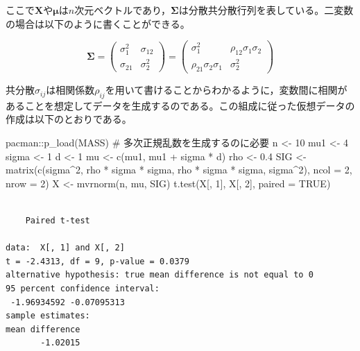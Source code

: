 \documentclass[
  a4paper,
]{ltjsbook}
\newenvironment{Shaded}{\begin{snugshade}}{\end{snugshade}}
\newcommand{\AttributeTok}[1]{\textcolor[rgb]{0.40,0.45,0.13}{#1}}
\newcommand{\CommentTok}[1]{\textcolor[rgb]{0.37,0.37,0.37}{#1}}
\newcommand{\ConstantTok}[1]{\textcolor[rgb]{0.56,0.35,0.01}{#1}}
\newcommand{\DecValTok}[1]{\textcolor[rgb]{0.68,0.00,0.00}{#1}}
\newcommand{\FloatTok}[1]{\textcolor[rgb]{0.68,0.00,0.00}{#1}}
\newcommand{\FunctionTok}[1]{\textcolor[rgb]{0.28,0.35,0.67}{#1}}
\newcommand{\NormalTok}[1]{\textcolor[rgb]{0.00,0.23,0.31}{#1}}
\newcommand{\OtherTok}[1]{\textcolor[rgb]{0.00,0.23,0.31}{#1}}
\newcommand{\SpecialCharTok}[1]{\textcolor[rgb]{0.37,0.37,0.37}{#1}}
\begin{document}
ここで\(\mathbf{X}\)や\(\mathbf{\mu}\)は\(n\)次元ベクトルであり，\(\mathbf{\Sigma}\)は分散共分散行列を表している。二変数の場合は以下のように書くことができる。

\[\mathbf{\Sigma} = \begin{pmatrix} \sigma_1^2 & \sigma_{12}\\ \sigma_{21} & \sigma_2^2 \end{pmatrix} = \begin{pmatrix} \sigma_1^2 & \rho_{12}\sigma_1\sigma_2 \\ \rho_{21}\sigma_2\sigma_1 & \sigma_2^2 \end{pmatrix}\]

共分散\(\sigma_{ij}\)は相関係数\(\rho_{ij}\)を用いて書けることからわかるように，変数間に相関があることを想定してデータを生成するのである。この組成に従った仮想データの作成は以下のとおりである。

\begin{Shaded}
\begin{Highlighting}[]
\NormalTok{pacman}\SpecialCharTok{::}\FunctionTok{p\_load}\NormalTok{(MASS) }\CommentTok{\# 多次正規乱数を生成するのに必要}
\NormalTok{n }\OtherTok{\textless{}{-}} \DecValTok{10}
\NormalTok{mu1 }\OtherTok{\textless{}{-}} \DecValTok{4}
\NormalTok{sigma }\OtherTok{\textless{}{-}} \DecValTok{1}
\NormalTok{d }\OtherTok{\textless{}{-}} \DecValTok{1}
\NormalTok{mu }\OtherTok{\textless{}{-}} \FunctionTok{c}\NormalTok{(mu1, mu1 }\SpecialCharTok{+}\NormalTok{ sigma }\SpecialCharTok{*}\NormalTok{ d)}
\NormalTok{rho }\OtherTok{\textless{}{-}} \FloatTok{0.4}
\NormalTok{SIG }\OtherTok{\textless{}{-}} \FunctionTok{matrix}\NormalTok{(}\FunctionTok{c}\NormalTok{(sigma}\SpecialCharTok{\^{}}\DecValTok{2}\NormalTok{, rho }\SpecialCharTok{*}\NormalTok{ sigma }\SpecialCharTok{*}\NormalTok{ sigma, rho }\SpecialCharTok{*}\NormalTok{ sigma }\SpecialCharTok{*}\NormalTok{ sigma, sigma}\SpecialCharTok{\^{}}\DecValTok{2}\NormalTok{), }\AttributeTok{ncol =} \DecValTok{2}\NormalTok{, }\AttributeTok{nrow =} \DecValTok{2}\NormalTok{)}
\NormalTok{X }\OtherTok{\textless{}{-}} \FunctionTok{mvrnorm}\NormalTok{(n, mu, SIG)}
\FunctionTok{t.test}\NormalTok{(X[, }\DecValTok{1}\NormalTok{], X[, }\DecValTok{2}\NormalTok{], }\AttributeTok{paired =} \ConstantTok{TRUE}\NormalTok{)}
\end{Highlighting}
\end{Shaded}

\begin{verbatim}

    Paired t-test

data:  X[, 1] and X[, 2]
t = -2.4313, df = 9, p-value = 0.0379
alternative hypothesis: true mean difference is not equal to 0
95 percent confidence interval:
 -1.96934592 -0.07095313
sample estimates:
mean difference 
       -1.02015 
\end{verbatim}
\end{document}
